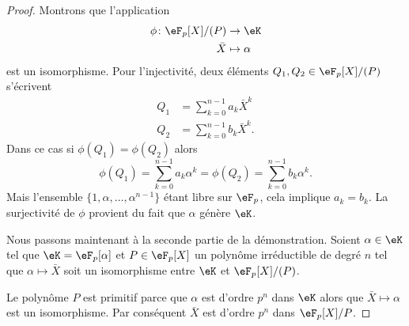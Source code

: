 \begin{proof}
    Montrons que l'application
    \begin{equation}
        \begin{aligned}
            \phi\colon \eF_p[X]/(P)&\to \eK \\
            \bar X&\mapsto \alpha 
        \end{aligned}
    \end{equation}
    est un isomorphisme. Pour l'injectivité, deux éléments \( Q_1,Q_2\in \eF_p[X]/(P)\) s'écrivent
    \begin{subequations}
        \begin{align}
            Q_1&=\sum_{k=0}^{n-1}a_k\bar X^k\\
            Q_2&=\sum_{k=0}^{n-1}b_k\bar X^k.
        \end{align}
    \end{subequations}
    Dans ce cas si \( \phi(Q_1)=\phi(Q_2)\) alors
    \begin{equation}
        \phi(Q_1)=\sum_{k=0}^{n-1}a_k\alpha^k=\phi(Q_2)=\sum_{k=0}^{n-1}b_k\alpha^k.
    \end{equation}
    Mais l'ensemble \( \{ 1,\alpha,\ldots, \alpha^{n-1} \}\) étant libre sur \( \eF_p\), cela implique \( a_k=b_k\). La surjectivité de \( \phi\) provient du fait que \( \alpha\) génère \( \eK\).

    Nous passons maintenant à la seconde partie de la démonstration. Soient \( \alpha\in \eK\) tel que \( \eK=\eF_p[\alpha]\) et \( P\in \eF_p[X]\) un polynôme irréductible de degré \( n\) tel que \( \alpha\mapsto \bar X\) soit un isomorphisme entre \( \eK\) et \( \eF_p[X]/(P)\).

    Le polynôme \( P\) est primitif parce que \( \alpha\) est d'ordre \( p^n\) dans \( \eK\) alors que \( \bar X\mapsto \alpha\) est un isomorphisme. Par conséquent \( \bar X\) est d'ordre \( p^n\) dans \( \eF_p[X]/P\).


\end{proof}

